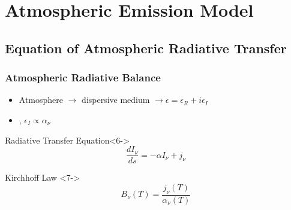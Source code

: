 \documentclass[10pt,aspectratio=169]{beamer}
\begin{document}
\section{Atmospheric Emission Model}
\subsection{Equation of Atmospheric Radiative Transfer}

\begin{frame}
\frametitle{Atmospheric Radiative Balance}

\begin{itemize}
\item<1-4,6-> Atmosphere $\rightarrow$ \alert{dispersive} medium $\rightarrow \epsilon = \epsilon_R + i\epsilon_I$
\item<2-4,6-> ,
          \quad $\epsilon_I \propto \alpha_\nu$ 
\end{itemize}


\begin{block}{Radiative Transfer Equation}<6->
\begin{equation}
\frac{dI_\nu}{ds} = -\alpha I_\nu + j_\nu
\end{equation}
\end{block}

\begin{block}{Kirchhoff Law }<7->
\begin{equation}
B_\nu(T) = \frac{j_\nu(T)}{\alpha_\nu(T)}
\end{equation}
\end{block}

\end{frame}
\end{document}
